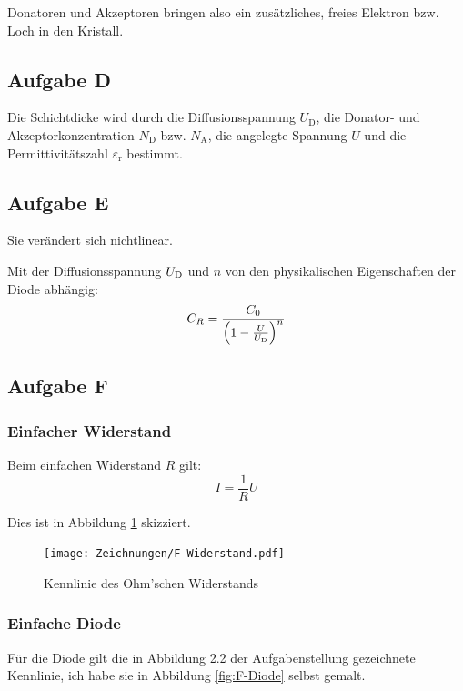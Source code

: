 Donatoren und Akzeptoren bringen also ein zusätzliches, freies Elektron bzw.
Loch in den Kristall. \cite[§~18.4.2]{meschede-gerthsen_24}

\subsection{Aufgabe D}

Die Schichtdicke wird durch die Diffusionsspannung $U_\text{D}$, die Donator-
und Akzeptorkonzentration $N_\text{D}$ bzw. $N_\text{A}$, die angelegte
Spannung $U$ und die Permittivitätszahl $\varepsilon_\text{r}$ bestimmt.

\subsection{Aufgabe E}

Sie verändert sich nichtlinear. \cite[§~15.2.2]{beuth/elementare_elektronik}

Mit der Diffusionsspannung $U_\text D$ und $n$ von den physikalischen
Eigenschaften der Diode abhängig:
\cite[§~1.1.1.1.2]{antula/schaltungen_mikroelektronik}
\[
	C_R = \frac{C_0}{\del{1- \frac U{U_\text D}}^n}
\]

\subsection{Aufgabe F}

\subsubsection{Einfacher Widerstand}

Beim einfachen Widerstand $R$ gilt:
\[
	I = \frac 1R U
\]

Dies ist in Abbildung \ref{fig:F-Widerstand} skizziert.

\begin{figure}[h]
	\centering
	\caption{%
		Kennlinie des Ohm'schen Widerstands
	}
	\label{fig:F-Widerstand}
	\texttt{[image: Zeichnungen/F-Widerstand.pdf]}
\end{figure}

\subsubsection{Einfache Diode}

Für die Diode gilt die in Abbildung 2.2 der Aufgabenstellung gezeichnete
Kennlinie, ich habe sie in Abbildung \ref{fig:F-Diode} selbst gemalt.

